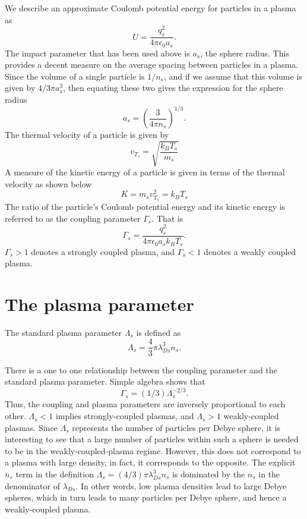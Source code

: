 \documentclass[a4paper,11pt]{report}
\begin{document}
We describe an approximate Coulomb potential energy for particles in a plasma as
\begin{equation}
    U =  \frac{q_s^2}{4 \pi \epsilon_0 a_s}.
\end{equation}
The impact parameter that has been used above is $a_s$, the sphere radius. This provides a decent measure on the average spacing between particles in a plasma. Since the volume of a single particle is $1/n_s$, and if we assume that this volume is given by $4/3 \pi a_s^3$, then equating these two gives the expression for the sphere radius
\begin{equation}
    a_s = \left ( \frac{3}{4 \pi n_s} \right )^{1/3}.
\end{equation}
The thermal velocity of a particle is given by
\begin{equation}
    v_{T_s} = \sqrt{\frac{k_B T_s}{m_s}}
\end{equation}
A measure of the kinetic energy of a particle is given in terms of the thermal velocity as shown below
\begin{equation}
    K = m_s v_{T_s}^2 = k_B T_s
\end{equation}
The ratio of the particle's Coulomb potential energy and its kinetic energy is referred to as the coupling parameter $\Gamma_s$. That is 
\begin{equation}
    \Gamma_s = \frac{q_s^2}{4 \pi \epsilon_0 a_s k_B T_s}.
\end{equation}
$\Gamma_s > 1$ denotes a strongly coupled plasma, and $\Gamma_s < 1$ denotes a weakly coupled plasma. 

\section{The plasma parameter}
The standard plasma parameter $\Lambda_s$ is defined as
\begin{equation}
    \Lambda_s = \frac{4}{3} \pi \lambda_{Ds}^3 n_s.
\end{equation}

There is a one to one relationship between the coupling parameter and the standard plasma parameter. Simple algebra shows that 
\begin{equation}
    \Gamma_s = (1/3) \Lambda_s^{-2/3}.
\end{equation}
Thus, the coupling and plasma parameters are inversely proportional to each other. $\Lambda_s < 1$ implies strongly-coupled plasmas, and $\Lambda_s > 1$ weakly-coupled plasmas. Since $\Lambda_s$ represents the number of particles per Debye sphere, it is interesting to see that a large number of particles within such a sphere is needed to be in the weakly-coupled-plasma regime. However, this does not correspond to a plasma with large density, in fact, it corresponds to the opposite. The explicit $n_s$ term in the definition $\Lambda_s = (4/3) \pi \lambda^3_{Ds} n_s$ is dominated by the $n_s$ in the denominator of $\lambda_{Ds}$. In other words, low plasma densities lead to large Debye spheres, which in turn leads to many particles per Debye sphere, and hence a weakly-coupled plasma.
\end{document}
